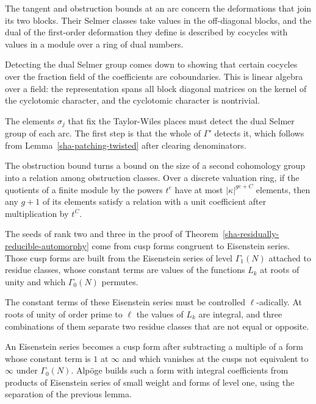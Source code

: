 The tangent and obstruction bounds at an arc concern the deformations that join its two blocks. Their Selmer classes take values in the off-diagonal blocks, and the dual of the first-order deformation they define is described by cocycles with values in a module over a ring of dual numbers.

Detecting the dual Selmer group comes down to showing that certain cocycles over the fraction field of the coefficients are coboundaries. This is linear algebra over a field: the representation spans all block diagonal matrices on the kernel of the cyclotomic character, and the cyclotomic character is nontrivial.

The elements $\sigma_j$ that fix the Taylor-Wiles places must detect the dual Selmer group of each arc. The first step is that the whole of $\Gamma'$ detects it, which follows from Lemma~\ref{sha-patching-twisted} after clearing denominators.

The obstruction bound turns a bound on the size of a second cohomology group into a relation among obstruction classes. Over a discrete valuation ring, if the quotients of a finite module by the powers $t^e$ have at most $|\kappa|^{ge+C}$ elements, then any $g+1$ of its elements satisfy a relation with a unit coefficient after multiplication by $t^C$.

The seeds of rank two and three in the proof of Theorem~\ref{sha-residually-reducible-automorphy} come from cusp forms congruent to Eisenstein series. Those cusp forms are built from the Eisenstein series of level $\Gamma_1(N)$ attached to residue classes, whose constant terms are values of the functions $L_k$ at roots of unity and which $\Gamma_0(N)$ permutes.

The constant terms of these Eisenstein series must be controlled $\ell$-adically. At roots of unity of order prime to $\ell$ the values of $L_k$ are integral, and three combinations of them separate two residue classes that are not equal or opposite.

An Eisenstein series becomes a cusp form after subtracting a multiple of a form whose constant term is $1$ at $\infty$ and which vanishes at the cusps not equivalent to $\infty$ under $\Gamma_0(N)$. Alpöge builds such a form with integral coefficients from products of Eisenstein series of small weight and forms of level one, using the separation of the previous lemma.

